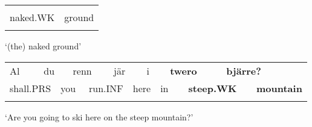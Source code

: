 \begin{listWWNumlxxiileveli}
\item {}

\end{listWWNumlxxiileveli}

\begin{tabular}{ll}
\lsptoprule
\multicolumn{2}{l}{bero

}\\
naked.WK & ground\\
\lspbottomrule
\end{tabular}

\begin{styleTranslation}
‘(the) naked ground’

\end{styleTranslation}

\begin{tabular}{llllllllllllll}
\lsptoprule
Al & \multicolumn{2}{l}{du

} & \multicolumn{2}{l}{renn

} & \multicolumn{2}{l}{jär

} & \multicolumn{2}{l}{i

} & \multicolumn{2}{l}{{\bfseries twero}

} & \multicolumn{2}{l}{{\bfseries bjärre?}

} & \\
\multicolumn{2}{l}{shall.PRS

} & \multicolumn{2}{l}{you

} & \multicolumn{2}{l}{run.INF

} & \multicolumn{2}{l}{here

} & \multicolumn{2}{l}{in

} & \multicolumn{2}{l}{{\bfseries steep.WK}

} & \multicolumn{2}{l}{{\bfseries mountain}

}\\
\lspbottomrule
\end{tabular}

\begin{styleTranslation}
‘Are you going to ski here on the steep mountain?’

\end{styleTranslation}

